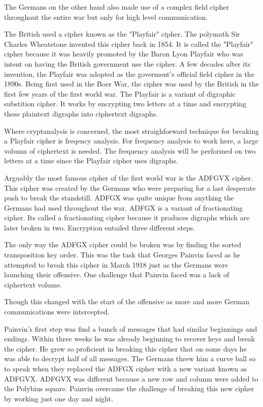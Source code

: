 \documentclass{article}
\begin{document}
    The Germans on the other hand also made use of a complex field cipher throughout
    the entire war but only for high level communication.

    The British used a cipher known as the "Playfair" cipher. The polymath
    Sir Charles Wheatstone invented this cipher back in 1854.
    It is called the "Playfair" cipher because it was heavily promoted
    by the Baron Lyon Playfair who was intent on having the British government
    use the cipher. A few decades after its invention, the Playfair was adopted
    as the goverment's official field cipher in the 1890s.
    Being first used in the Boer War, the cipher was used by the British in
    the first few years of the first world war.
    The Playfair is a variant of digraphic substition cipher.
    It works by encrypting two letters at a time and encrypting these
    plaintext digraphs into ciphertext digraphs.

    Where cryptanalysis is concerned, the most straighforward technique for
    breaking a Playfair cipher is freqency analysis.
    For frequency analysis to work here, a large volumn of ciphertext is needed.
    The frequency analysis will be performed on two letters at a time since
    the Playfair cipher uses digraphs.

    Arguably the most famous cipher of the first world war is the
    ADFGVX cipher. This cipher was created by the Germans who were
    preparing for a last desperate push to break the standstill.
    ADFGX was quite unique from anything the Germans had used
    throughout the war. ADFGX is a variant of fractionating cipher.
    Its called a fractionating cipher because it produces
    digraphs which are later broken in two.
    Encryption entailed three different steps.

    The only way the ADFGX cipher could be broken was by finding
    the sorted transposition key order.
    This was the task that Georges Painvin faced as he attempted
    to break this cipher in March 1918 just as the Germans were
    launching their offensive.
    One challenge that Painvin faced was a lack of ciphertext volume.

    Though this changed with the start of the offensive as
    more and more German communications were intercepted.

    Painvin's first step was find a bunch of messages that had
    similar beginnings and endings.
    Within three weeks he was already beginning to recover keys
    and break the cipher. He grew so proficient in breaking
    this cipher that on some days he was able to decrypt
    half of all messages.
    The Germans threw him a curve ball so to speak when they
    replaced the ADFGX cipher with a new variant known as ADFGVX.
    ADFGVX was different because a new row and column were added
    to the Polybius square.
    Painvin overcame the challenge of breaking this new cipher
    by working just one day and night.
\end{document}
